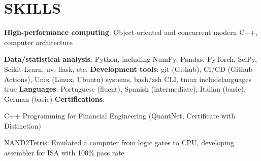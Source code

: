 \section{SKILLS}
\textbf{High-performance computing}: Object-oriented and concurrent modern C++, computer architecture

\textbf{Data/statistical analysis}: Python, including NumPy, Pandas, PyTorch, SciPy, Scikit-Learn, uv, flask, etc.
\newline
\textbf{Development tools}: git (Github), CI/CD (Github Actions), Unix (Linux, Ubuntu) systems, bash/zsh CLI, tmux
\ifcsname includelanguages\endcsname
    \if{} true
        \textbf{Languages}: Portuguese (fluent), Spanish (intermediate), Italian (basic), German (basic) \newline
    \fi
\fi
{}
\textbf{Certifications}:
\begin{onecolentry}
    \begin{highlights}
        \item C++ Programming for Financial Engineering (QuantNet, Certificate with Distinction)
        \item NAND2Tetris: Emulated a computer from logic gates to CPU, developing assembler for ISA with 100\% pass rate
    \end{highlights}
\end{onecolentry}
